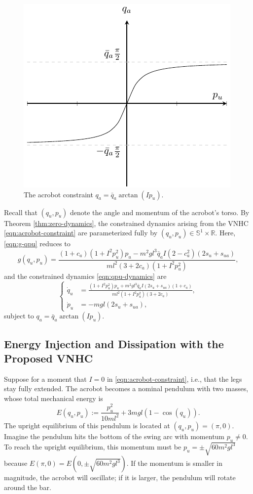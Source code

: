 \documentclass[journal,twoside,web, twocolumn,draftcls]{ieeecolor}
\newcommand*{\R}{\mathbb{R}}
\newcommand*{\Sone}{\mathbb{S}^1}
\newcommand*{\SxR}{\Sone \times \R}
\begin{document}
\begin{figure}
    \centering
    \includegraphics[width=0.7\linewidth]{qa_arctan.pdf}
    \caption{The acrobot constraint \(q_a = \bar{q}_a \arctan(I p_u)\).}
    \label{fig:qa-arctan}
\end{figure}

Recall that \((q_u, p_u)\) denote the angle and momentum of the acrobot's torso.
By Theorem \ref{thm:zero-dynamics}, the constrained dynamics arising from the
VNHC \eqref{eqn:acrobot-constraint} are parameterized fully by 
\((q_u,p_u) \in \SxR\).
Here, \eqref{eqn:g-qpu} reduces to
\begin{equation*}
    g(q_u,p_u) = \frac{
        (1+c_a)(1+I^2 p_u^2)p_u - m^2gl^3\bar{q}_a I (2-c_a^2)(2s_u + s_{ua})
    }{ml^2(3+2c_a)(1+I^2 p_u^2)}
    ,
\end{equation*}
and the constrained dynamics \eqref{eqn:qpu-dynamics} are
\begin{equation}\label{eqn:acrobot-constrained-dynamics}
    \begin{cases}
    \dot{q}_u &= \frac{(1+I^2 p_u^2)p_u + m^2gl^3\bar{q}_a I(2s_u + s_{ua})(1+c_a) }
            {ml^2(1+I^2 p_u^2)(3+2c_a)}
    ,    \\
    \dot{p}_u &= - m g l (2s_u + s_{ua})
    ,
    \end{cases}
\end{equation}
subject to \(q_a = \bar{q}_a \arctan(I p_u)\).

\subsection{Energy Injection and Dissipation with the Proposed VNHC}
Suppose for a moment that \(I = 0\) in \eqref{eqn:acrobot-constraint}, i.e.,
that the legs stay fully extended.
The acrobot becomes a nominal pendulum with two masses, whose total mechanical
energy is
\begin{equation}\label{eqn:nominal-energy}
    E(q_u,p_u) := \frac{p_u^2}{10ml^2} + 3mgl(1 - \cos(q_u))
    .
\end{equation}
The upright equilibrium of this pendulum is located at \((q_u,p_u) = (\pi,0)\).
Imagine the pendulum hits the bottom of the swing arc with momentum 
\(p_u \neq 0\). 
To reach the upright equilibrium, this momentum must be
\(p_u = \pm\sqrt{60m^2gl^3}\) because \(E(\pi,0) = E(0,\pm\sqrt{60m^2gl^3})\).
If the momentum is smaller in magnitude, the acrobot will oscillate; 
if it is larger, the pendulum will rotate around the bar.
\end{document}
